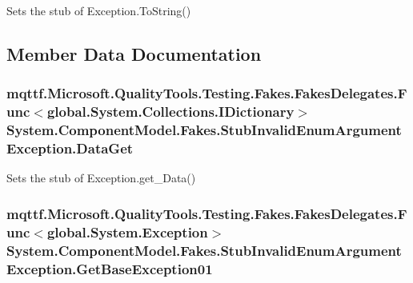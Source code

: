 Sets the stub of Exception.\-To\-String()



\subsection{Member Data Documentation}
\hypertarget{class_system_1_1_component_model_1_1_fakes_1_1_stub_invalid_enum_argument_exception_a606ea6828dd4bc8ddbba5a4a00fb1ecd}{
\subsubsection[{Data\-Get}]{\setlength{\rightskip}{0pt plus 5cm}mqttf.\-Microsoft.\-Quality\-Tools.\-Testing.\-Fakes.\-Fakes\-Delegates.\-Func$<$global.\-System.\-Collections.\-I\-Dictionary$>$ System.\-Component\-Model.\-Fakes.\-Stub\-Invalid\-Enum\-Argument\-Exception.\-Data\-Get}}\label{class_system_1_1_component_model_1_1_fakes_1_1_stub_invalid_enum_argument_exception_a606ea6828dd4bc8ddbba5a4a00fb1ecd}


Sets the stub of Exception.\-get\-\_\-\-Data()

\hypertarget{class_system_1_1_component_model_1_1_fakes_1_1_stub_invalid_enum_argument_exception_aa74a7d58a143f1f8f9816398d6ee21ca}{
\subsubsection[{Get\-Base\-Exception01}]{\setlength{\rightskip}{0pt plus 5cm}mqttf.\-Microsoft.\-Quality\-Tools.\-Testing.\-Fakes.\-Fakes\-Delegates.\-Func$<$global.\-System.\-Exception$>$ System.\-Component\-Model.\-Fakes.\-Stub\-Invalid\-Enum\-Argument\-Exception.\-Get\-Base\-Exception01}}\label{class_system_1_1_component_model_1_1_fakes_1_1_stub_invalid_enum_argument_exception_aa74a7d58a143f1f8f9816398d6ee21ca}


